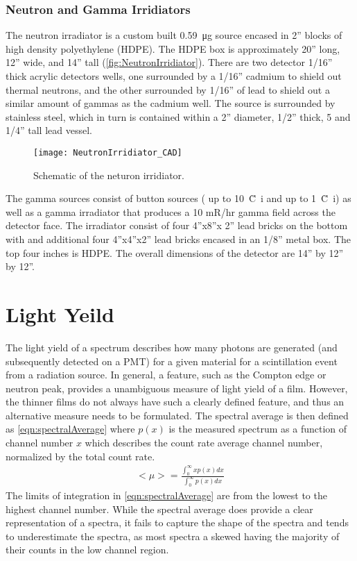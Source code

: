 \subsubsection{Neutron and Gamma Irridiators}
The neutron irradiator is a custom built \SI{0.59}{\ug}  source encased in 2” blocks of high density polyethylene (HDPE). 
The HDPE box is approximately 20” long, 12” wide, and 14” tall (\autoref{fig:NeutronIrridiator}). 
There are two detector 1/16” thick acrylic detectors wells, one surrounded by a 1/16” cadmium to shield out thermal neutrons, and the other surrounded by 1/16” of lead to shield out a similar amount of gammas as the cadmium well.
The  source is surrounded by stainless steel, which in turn is contained within a 2” diameter, 1/2” thick, 5 and 1/4” tall lead vessel.
\begin{figure}
  \centering
  \texttt{[image: NeutronIrridiator\_CAD]}
  \caption[CAD Rendering of Neutron Irridiator]{Schematic of the neturon irridiator.}
  \label{fig:NeutronIrridiator}
\end{figure}
The gamma sources consist of button sources ( up to \SI{10}{\u Ci} and  up to \SI{1}{\u Ci}) as well as a gamma irradiator that produces a 10 mR/hr gamma field across the detector face. 
The irradiator consist of four 4”x8”x 2” lead bricks on the bottom with and additional four 4”x4”x2” lead bricks encased in an 1/8” metal box. 
The top four inches is HDPE. 
The overall dimensions of the detector are 14” by 12” by 12”. 

\section{Light Yeild}
The light yield of a spectrum describes how many photons are generated (and subsequently detected on a PMT) for a given material for a scintillation event from a radiation source.
In general, a feature, such as the Compton edge or neutron peak,  provides a unambiguous measure of light yield of a film. 
However, the thinner films do not always have such a clearly defined feature, and thus an alternative measure needs to be formulated.
The spectral average is then defined as \eqref{eqn:spectralAverage} where $p(x)$ is the measured spectrum as a function of channel number $x$ which describes the count rate average channel number, normalized by the total count rate.
\begin{align}
	<\mu> = \frac{\int_0^\infty x p(x) dx}{\int_0^\infty p(x) dx}
	\label{eqn:spectralAverage}
\end{align}
The limits of integration in \eqref{eqn:spectralAverage} are from the lowest to the highest channel number.
While the spectral average does provide a clear representation of a spectra, it fails to capture the shape of the spectra and tends to underestimate the spectra, as most spectra a skewed having the majority of their counts in the low channel region.

